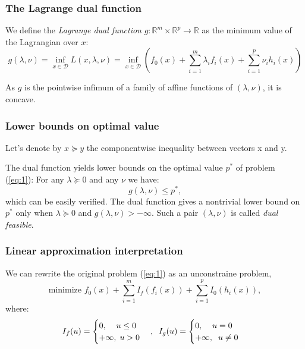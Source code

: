 \documentclass{article}
\newcommand{\R}{{\mathbb{R}}}
\begin{document}
\subsubsection{The Lagrange dual function}

We define the \textit{Lagrange dual function} $g: \R^m \times \R^p \rightarrow \R$ as the minimum value of the Lagrangian over $x$: 
$$  g(\lambda,\nu) = \inf_{x \in \mathcal{D}} L(x, \lambda, \nu) = \inf_{x \in \mathcal{D}} \left(f_0(x) + \sum_{i=1}^m \lambda_i f_i(x) + \sum_{i=1}^p \nu_i h_i(x) \right)$$

As $g$ is the pointwise infimum of a family of affine functions of $(\lambda,\nu)$, it is concave.
	
\subsubsection{Lower bounds on optimal value}
Let's denote by $x \succeq y$ the componentwise inequality between vectors x and y. 

The dual function yields lower bounds on the optimal value $p^*$ of problem (\ref{eq:1}): For any $\lambda \succeq 0$ and any $\nu$ we have: 
\begin{equation} \label{eq:2}
g(\lambda,\nu) \le p^*,
\end{equation}
which can be easily verified. The dual function gives a nontrivial lower bound on $p^*$ only when $\lambda \succeq 0$ and $g(\lambda,\nu) > -\infty.$ Such a pair $(\lambda,\nu)$ is called \textit{dual feasible}.

\subsubsection{Linear approximation interpretation}

We can rewrite the original problem (\ref{eq:1}) as an unconstraine problem,
\begin{equation} \label{eq:unconstrained}
\textrm{minimize } f_0(x) + \sum_{i=1}^m I_f(f_i(x)) + \sum_{i=1}^p I_0 (h_i(x)), 
\end{equation}
where:
$$I_f(u) = 
\begin{cases}
0, \hspace{0.4cm} u \le 0\\
+\infty, \hspace{0.1cm} u > 0
\end{cases}, \hspace{0.2cm}
I_g(u) = 
\begin{cases}
0, \hspace{0.4cm} u = 0\\
+\infty, \hspace{0.2cm} u \neq 0
\end{cases}$$
\end{document}
